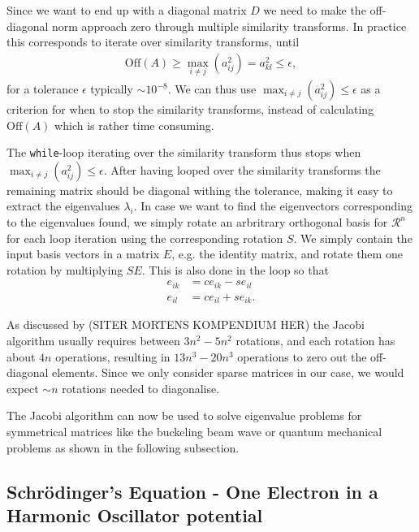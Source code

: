 \documentclass[twocolumn]{aastex62}
\begin{document}
Since we want to end up with a diagonal matrix $D$ we need to make the off-diagonal norm approach zero through multiple similarity transforms. In practice this corresponds to iterate over similarity transforms, until 
\begin{align}
\text{Off}(A) \geq \max_{i\neq j}(a_{ij}^2) = a_{kl}^2 \leq \epsilon,
\end{align}
for a tolerance $\epsilon$ typically $\sim 10^{-8}$. We can thus use 
$\max_{i\neq j}(a_{ij}^2)\leq \epsilon$ as a criterion for when to stop the similarity transforms, instead of calculating $\text{Off}(A)$ which is rather time consuming.

The \texttt{while}-loop iterating over the similarity transform thus stops when $\max_{i\neq j}(a_{ij}^2) \leq \epsilon$. After having looped over the similarity transforms the remaining matrix should be diagonal withing the tolerance, making it easy to extract the eigenvalues $\lambda_i$. In case we want to find the eigenvectors corresponding to the eigenvalues found, we simply rotate an arbritrary orthogonal basis for $\mathcal{R}^n$ for each loop iteration using the corresponding rotation $S$. We simply contain the input basis vectors in a matrix $E$, e.g. the identity matrix, and rotate them one rotation by multiplying $SE$. This is also done in the loop so that 
\begin{align}
	e_{ik} &= ce_{ik} - se_{il}\\
	e_{il} &= ce_{il} + se_{ik}.
\end{align}

As discussed by (SITER MORTENS KOMPENDIUM HER) the Jacobi algorithm usually requires between $3n^2-5n^2$ rotations, and each rotation has about $4n$ operations, resulting in $13n^3-20n^3$ operations to zero out the off-diagonal elements. Since we only consider sparse matrices in our case, we would expect $\sim n$ rotations needed to diagonalise. 

The Jacobi algorithm can now be used to solve eigenvalue problems for symmetrical matrices like the buckeling beam wave or quantum mechanical problems as shown in the following subsection. 

\subsection{Schrödinger's Equation - One Electron in a Harmonic Oscillator potential}
\end{document}
